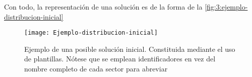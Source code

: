 Con todo, la representación de una solución es de la forma de la \autoref{fig:3:ejemplo-distribucion-inicial}

\begin{figure}[htbp]
	\centering
	\texttt{[image: Ejemplo-distribucion-inicial]}
	\caption[Ejemplo de una solución inicial]{Ejemplo de una posible solución inicial. Constituida mediante el uso 
		de plantillas. 
		Nótese que se emplean identificadores en vez del nombre completo de cada sector para abreviar}
	\label{fig:3:ejemplo-distribucion-inicial}
\end{figure}





